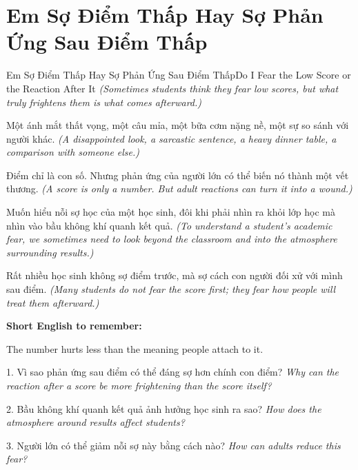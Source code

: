 \section{Em Sợ Điểm Thấp Hay Sợ Phản Ứng Sau Điểm Thấp}
\begin{truyen}{Em Sợ Điểm Thấp Hay Sợ Phản Ứng Sau Điểm Thấp}{Do I Fear the Low Score or the Reaction After It}
\textit{(Sometimes students think they fear low scores, but what truly frightens them is what comes afterward.)}

Một ánh mắt thất vọng, một câu mỉa, một bữa cơm nặng nề, một sự so sánh với người khác.
\textit{(A disappointed look, a sarcastic sentence, a heavy dinner table, a comparison with someone else.)}

Điểm chỉ là con số. Nhưng phản ứng của người lớn có thể biến nó thành một vết thương.
\textit{(A score is only a number. But adult reactions can turn it into a wound.)}

Muốn hiểu nỗi sợ học của một học sinh, đôi khi phải nhìn ra khỏi lớp học mà nhìn vào bầu không khí quanh kết quả.
\textit{(To understand a student's academic fear, we sometimes need to look beyond the classroom and into the atmosphere surrounding results.)}
\end{truyen}

\begin{baihoc}
Rất nhiều học sinh không sợ điểm trước, mà sợ cách con người đối xử với mình sau điểm.
\textit{(Many students do not fear the score first; they fear how people will treat them afterward.)}
\end{baihoc}

\begin{ghinhoanh}
\textbf{Short English to remember:}

The number hurts less than the meaning people attach to it.

\end{ghinhoanh}

\begin{tuhocnhanh}
1. Vì sao phản ứng sau điểm có thể đáng sợ hơn chính con điểm? \textit{Why can the reaction after a score be more frightening than the score itself?}

2. Bầu không khí quanh kết quả ảnh hưởng học sinh ra sao? \textit{How does the atmosphere around results affect students?}

3. Người lớn có thể giảm nỗi sợ này bằng cách nào? \textit{How can adults reduce this fear?}
\end{tuhocnhanh}
\ngancach

